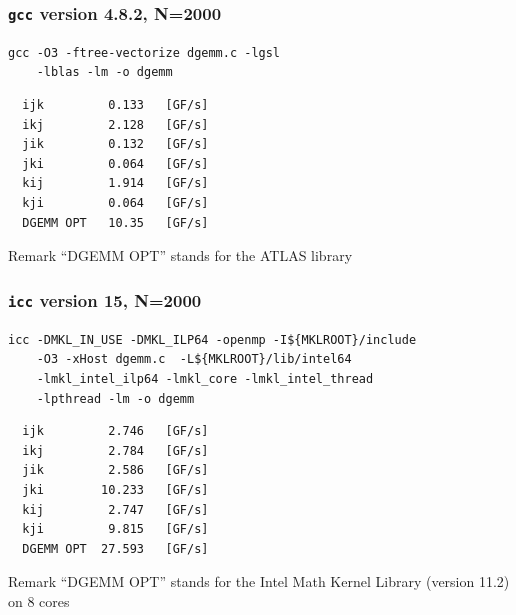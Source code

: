 \begin{frame}[containsverbatim]
\frametitle{\texttt{gcc} version 4.8.2, N=2000}

\verb+gcc -O3 -ftree-vectorize dgemm.c -lgsl + \\
\verb+    -lblas -lm -o dgemm+


\begin{verbatim}
  ijk         0.133   [GF/s]
  ikj         2.128   [GF/s]
  jik         0.132   [GF/s]
  jki         0.064   [GF/s]
  kij         1.914   [GF/s]
  kji         0.064   [GF/s]
  DGEMM OPT   10.35   [GF/s]
\end{verbatim}


\begin{block}{Remark}
``DGEMM OPT'' stands for the ATLAS library
\end{block}
\end{frame}

\begin{frame}[containsverbatim]
\frametitle{\texttt{icc} version 15, N=2000}

\verb+icc -DMKL_IN_USE -DMKL_ILP64 -openmp -I${MKLROOT}/include +\\
\verb+    -O3 -xHost dgemm.c  -L${MKLROOT}/lib/intel64 +\\
\verb+    -lmkl_intel_ilp64 -lmkl_core -lmkl_intel_thread+\\
\verb+    -lpthread -lm -o dgemm+


\begin{verbatim}
  ijk         2.746   [GF/s]
  ikj         2.784   [GF/s]
  jik         2.586   [GF/s]
  jki        10.233   [GF/s]
  kij         2.747   [GF/s]
  kji         9.815   [GF/s]
  DGEMM OPT  27.593   [GF/s]
\end{verbatim}

\begin{block}{Remark}
``DGEMM OPT'' stands for the Intel Math Kernel Library (version 11.2)  on 8 cores
\end{block}
\end{frame}


